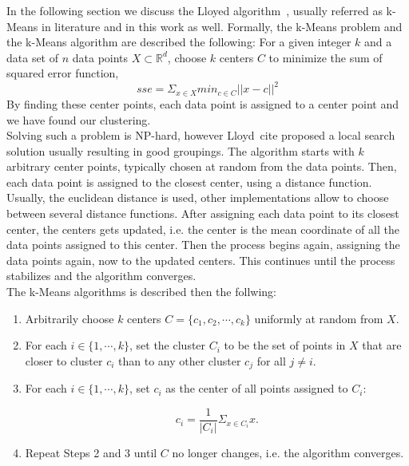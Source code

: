 In the following section we discuss the Lloyed algorithm~\parencite{Lloyd82}, usually referred as k-Means in literature and in this work as well. Formally, the k-Means problem and the k-Means algorithm are described the following: For a given integer $k$ and a data set of $n$ data points $X \subset  \mathbb{R}^d$, choose $k$ centers $C$ to minimize the sum of squared error function,
\begin{equation*}
sse = \Sigma_{x \in X} min_{c \in C} ||x - c||^2
\end{equation*}
By finding these center points, each data point is assigned to a center point and we have found our clustering.
\\ 
Solving such a problem is NP-hard, however Lloyd~cite proposed a local search solution usually resulting in good groupings. The algorithm starts with $k$ arbitrary center points, typically chosen at random from the data points. Then, each data point is assigned to the closest center, using a distance function. Usually, the euclidean distance is used, other implementations allow to choose between several distance functions. After assigning each data point to its closest center, the centers gets updated, i.e. the center is the mean coordinate of all the data points assigned to this center. Then the process begins again, assigning the data points again, now to the updated centers. This continues until the process stabilizes and the algorithm converges.
\\
The k-Means algorithms is described then the follwing:

\begin{enumerate} 
\item Arbitrarily choose $k$ centers $C = \{c_1, c_2, \cdots, c_k\}$ uniformly at random from $X$.
\item For each $i \in \{1, \cdots, k\}$, set the cluster $C_i$ to be the set of points in $X$ that are closer to cluster $c_i$ than to any other cluster $c_j$ for all $j \neq i$.
\item For each $i \in \{1, \cdots, k\}$, set $c_i$ as the center of all points assigned to $C_i$: 

\begin{equation*}
c_i = \frac{1}{|C_i|} \Sigma_{x \in C_i} x.
\end{equation*}

\item Repeat Steps 2 and 3 until $C$ no longer changes, i.e. the algorithm converges.
\end{enumerate}

